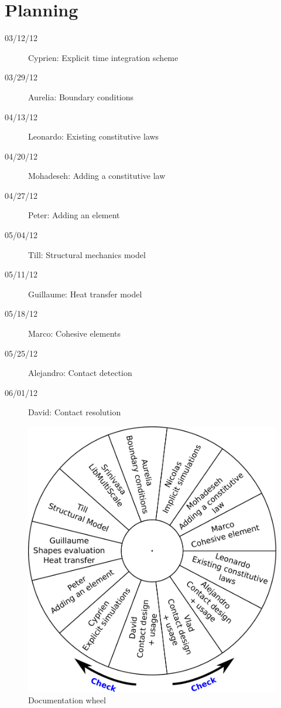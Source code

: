 \documentclass[a4paper,11pt]{book}
\begin{document}
\chapter{Planning}

\begin{description}
\item[03/12/12] Cyprien: Explicit time integration scheme
\item[03/29/12] Aurelia: Boundary conditions
\item[04/13/12] Leonardo: Existing constitutive laws
\item[04/20/12] Mohadeseh: Adding a constitutive law
\item[04/27/12] Peter: Adding an element
\item[05/04/12] Till: Structural mechanics model
\item[05/11/12] Guillaume: Heat transfer model
\item[05/18/12] Marco: Cohesive elements
\item[05/25/12] Alejandro: Contact detection
\item[06/01/12] David: Contact resolution
\end{description}

\begin{figure}[!htb]
  \centering
  \includegraphics[width=\linewidth]{figures/doc_wheel}
  \caption{Documentation wheel\label{fig:doc_wheel}}
\end{figure}
\end{document}
